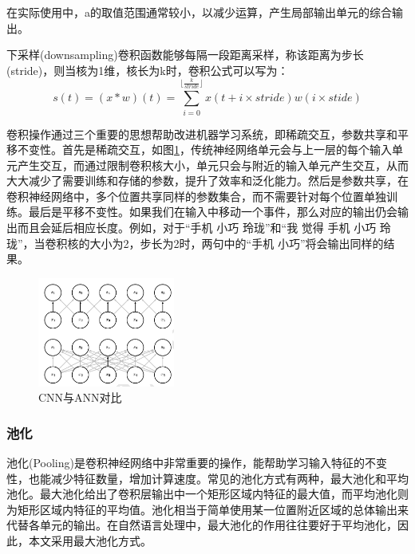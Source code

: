 在实际使用中，a的取值范围通常较小，以减少运算，产生局部输出单元的综合输出。


下采样(downsampling)卷积函数能够每隔一段距离采样，称该距离为步长(stride)，则当核为1维，核长为k时，卷积公式可以写为：
\begin{equation}
s(t) = (x * w)(t) = \sum_{i = 0}^{\lfloor{\frac{k}{stride}}\rfloor}{x(t + i \times stride)w(i \times stide)}
\end{equation}


卷积操作通过三个重要的思想帮助改进机器学习系统，即稀疏交互，参数共享和平移不变性\cite{deeplearning2016}。首先是稀疏交互，如图\ref{cnn1}，传统神经网络单元会与上一层的每个输入单元产生交互，而通过限制卷积核大小，单元只会与附近的输入单元产生交互，从而大大减少了需要训练和存储的参数，提升了效率和泛化能力。然后是参数共享，在卷积神经网络中，多个位置共享同样的参数集合，而不需要针对每个位置单独训练。最后是平移不变性。如果我们在输入中移动一个事件，那么对应的输出仍会输出而且会延后相应长度。例如，对于“手机 小巧 玲珑”和“我 觉得 手机 小巧 玲珑”，当卷积核的大小为2，步长为2时，两句中的“手机 小巧”将会输出同样的结果。

\begin{figure}[!hbp]
\begin{center}
\includegraphics[width=0.4\textwidth]{graphic/cnn1.png}
\caption{CNN与ANN对比\cite{deeplearning2016} \label{cnn1}}
\end{center}
\end{figure}

\subsubsection{池化}
池化(Pooling)是卷积神经网络中非常重要的操作，能帮助学习输入特征的不变性，也能减少特征数量，增加计算速度。常见的池化方式有两种，最大池化和平均池化。最大池化给出了卷积层输出中一个矩形区域内特征的最大值，而平均池化则为矩形区域内特征的平均值。池化相当于简单使用某一位置附近区域的总体输出来代替各单元的输出。在自然语言处理中，最大池化的作用往往要好于平均池化，因此，本文采用最大池化方式。
